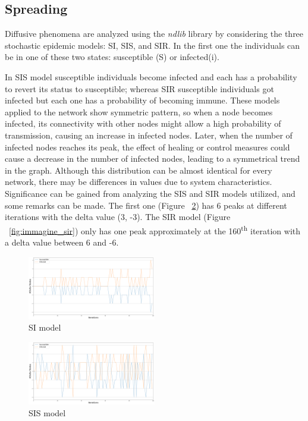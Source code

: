 \documentclass[sigchi]{acmart}
\begin{document}
\subsection{Spreading}
Diffusive phenomena are analyzed using the \textit{ndlib} \cite{Rossetti_2017} library by considering the three stochastic epidemic models: SI, SIS, and SIR. 
In the first one the individuals can be in one of these two states: susceptible (S) or infected(i).  

In SIS model susceptible individuals become infected and each has a probability to revert its status to susceptible; whereas SIR susceptible individuals got infected but each one has a probability of becoming immune. 
These models applied to the network show symmetric pattern, so when a node becomes infected, its connectivity with other nodes might allow a high probability of transmission, causing an increase in infected nodes. Later, when the number of infected nodes reaches its peak, the effect of healing or control measures could cause a decrease in the number of infected nodes, leading to a symmetrical trend in the graph.
Although this distribution can be almost identical for every network, there may be differences in values due to system characteristics. Significance can be gained from analyzing the SIS and SIR models utilized, and some remarks can be made. The first one (Figure ~\ref{fig:immagine_sis}) has 6 peaks at different iterations with the delta value (3, -3). The SIR model (Figure ~\ref{fig:immagine_sir}) only has one peak approximately at the 160\textsuperscript{th} iteration with a delta value between 6 and -6.

\begin{figure}[H]
  \centering
  \includegraphics[width=0.50\textwidth]{si.png}
  \caption{SI model}
  \label{fig:immagine}
\end{figure}
\begin{figure}[H]
  \centering
  \includegraphics[width=0.50\textwidth]{sis.png}
  \caption{SIS model}
  \label{fig:immagine_sis}
\end{figure}
\end{document}
